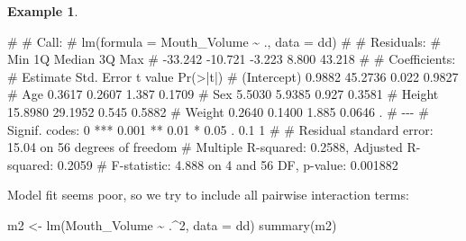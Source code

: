 \documentclass[
  a4paper,
]{article}
\newenvironment{Shaded}{\begin{snugshade}}{\end{snugshade}}
\newcommand{\AttributeTok}[1]{\textcolor[rgb]{0.77,0.63,0.00}{#1}}
\newcommand{\DecValTok}[1]{\textcolor[rgb]{0.00,0.00,0.81}{#1}}
\newcommand{\FunctionTok}[1]{\textcolor[rgb]{0.00,0.00,0.00}{#1}}
\newcommand{\NormalTok}[1]{#1}
\newcommand{\OtherTok}[1]{\textcolor[rgb]{0.56,0.35,0.01}{#1}}
\newcommand{\SpecialCharTok}[1]{\textcolor[rgb]{0.00,0.00,0.00}{#1}}
\theoremstyle{definition}
\theoremstyle{definition}
\newtheorem{example}{Example}[section]
\theoremstyle{definition}
\theoremstyle{definition}
\theoremstyle{remark}
\begin{document}
\begin{example}
\begin{Shaded}
\begin{Highlighting}[]
\NormalTok{\# }
\NormalTok{\# Call:}
\NormalTok{\# lm(formula = Mouth\_Volume \textasciitilde{} ., data = dd)}
\NormalTok{\# }
\NormalTok{\# Residuals:}
\NormalTok{\#     Min      1Q  Median      3Q     Max }
\NormalTok{\# {-}33.242 {-}10.721  {-}3.223   8.800  43.218 }
\NormalTok{\# }
\NormalTok{\# Coefficients:}
\NormalTok{\#             Estimate Std. Error t value Pr(\textgreater{}|t|)  }
\NormalTok{\# (Intercept)   0.9882    45.2736   0.022   0.9827  }
\NormalTok{\# Age           0.3617     0.2607   1.387   0.1709  }
\NormalTok{\# Sex           5.5030     5.9385   0.927   0.3581  }
\NormalTok{\# Height       15.8980    29.1952   0.545   0.5882  }
\NormalTok{\# Weight        0.2640     0.1400   1.885   0.0646 .}
\NormalTok{\# {-}{-}{-}}
\NormalTok{\# Signif. codes:  0 \textquotesingle{}***\textquotesingle{} 0.001 \textquotesingle{}**\textquotesingle{} 0.01 \textquotesingle{}*\textquotesingle{} 0.05 \textquotesingle{}.\textquotesingle{} 0.1 \textquotesingle{} \textquotesingle{} 1}
\NormalTok{\# }
\NormalTok{\# Residual standard error: 15.04 on 56 degrees of freedom}
\NormalTok{\# Multiple R{-}squared:  0.2588,  Adjusted R{-}squared:  0.2059 }
\NormalTok{\# F{-}statistic: 4.888 on 4 and 56 DF,  p{-}value: 0.001882}
\end{Highlighting}
\end{Shaded}

Model fit seems poor, so we try to include all pairwise interaction
terms:

\begin{Shaded}
\begin{Highlighting}[]
\NormalTok{m2 }\OtherTok{\textless{}{-}} \FunctionTok{lm}\NormalTok{(Mouth\_Volume }\SpecialCharTok{\textasciitilde{}}\NormalTok{ .}\SpecialCharTok{\^{}}\DecValTok{2}\NormalTok{, }\AttributeTok{data =}\NormalTok{ dd)}
\FunctionTok{summary}\NormalTok{(m2)}
\end{Highlighting}
\end{Shaded}


\end{example}
\end{document}
